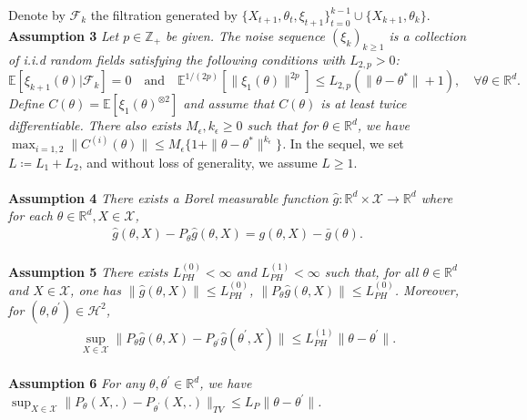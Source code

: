 \documentclass[a4paper]{article}
\newcommand{\norm}[1]{\|#1 \|}
\newcommand{\Exs}{\mathbb{E}}
\newcommand{\thetastar}{\theta^*}
\newcommand{\constLPH}[1]{L_{PH}^{(#1)}}
\begin{document}
	Denote by $\mathcal{F}_{k}$ the filtration generated by $\{X_{t + 1}, \theta_{t}, \xi_{t + 1}\}_{t = 0}^{k - 1} \cup \{X_{k + 1}, \theta_{k}\}$.
	\\
	\textbf{Assumption 3} \textit{
		Let $p \in \mathbb{Z}_{+}$ be given. The noise sequence $\left(\xi_{k}\right)_{k \ge 1}$ is a collection of i.i.d random fields satisfying the following conditions with $L_{2, p} > 0$:
		$$\Exs\left[\xi_{k + 1}(\theta) | \mathcal{F}_{k}\right] = 0 \quad \text{and} \quad \Exs^{1 / (2p)}\left[\norm{\xi_{1}(\theta)}^{2p}\right] \le L_{2, p}\left(\norm{\theta - \thetastar} + 1\right), \quad \forall \theta \in \mathbb{R}^{d}.$$
		Define $C(\theta) = \Exs\left[\xi_{1}(\theta)^{\otimes 2}\right]$ and assume that $C(\theta)$ is at least twice differentiable. There also exists $M_{\epsilon}, k_{\epsilon} \ge 0$ such that for $\theta \in \mathbb{R}^{d}$, we have $\max_{i = 1, 2}\norm{C^{(i)}(\theta)} \le M_{\epsilon}\{1 + \norm{\theta - \thetastar}^{k_{\epsilon}}\}$.
	}
	In the sequel, we set $L \coloneq L_{1} + L_{2}$, and without loss of generality, we assume $L \ge 1$.
	\\
	\\
	\textbf{Assumption 4} \textit{
		There exists a Borel measurable function $\hat{g}: \mathbb{R}^{d} \times \mathcal{X} \to \mathbb{R}^{d}$ where for each $\theta \in \mathbb{R}^{d}, X \in \mathcal{X}$,
		\begin{align*}
			\hat{g}\left(\theta, X\right) - P_{\theta}\hat{g}\left(\theta, X\right) = g\left(\theta, X\right) - \bar{g}\left(\theta\right).
		\end{align*}
	}
	\\
	\textbf{Assumption 5} \textit{
		There exists $\constLPH{0} <‌ \infty$ and $\constLPH{1} < \infty$ such that, for all $\theta \in \mathbb{R}^{d}$ and $X \in \mathcal{X}$, one has $\norm{\hat{g}\left(\theta, X\right)} \le \constLPH{0}$, $\norm{P_{\theta}\hat{g}\left(\theta, X\right)} \le \constLPH{0}$. Moreover, for $\left(\theta, \theta^{\prime}\right) \in \mathcal{H}^{2}$,
		\begin{align*}
			\sup_{X \in \mathcal{X}}\norm{P_{\theta}\hat{g}\left(\theta, X\right) - P_{\theta^{\prime}}\hat{g}\left(\theta^{\prime}, X\right)} \le \constLPH{1}\norm{\theta - \theta^{\prime}}.
		\end{align*}
	}
	\\
	\textbf{Assumption 6} \textit{
		For any $\theta, \theta^{\prime} \in \mathbb{R}^{d}$, we have $\sup_{X \in \mathcal{X}}\norm{P_{\theta}\left(X, .\right) - P_{\theta^{\prime}}\left(X, .\right)}_{TV} \le L_{P}\norm{\theta - \theta^{\prime}}$.
	}
\end{document}
